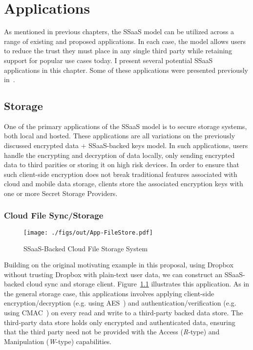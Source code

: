 \chapter{Applications}
\label{chap:apps}

As mentioned in previous chapters, the SSaaS model can be utilized
across a range of existing and proposed applications. In each case,
the model allows users to reduce the trust they must place in any
single third party while retaining support for popular use cases
today. I present several potential SSaaS applications in this
chapter. Some of these applications were presented previously
in~\cite{custos-trios}.

\section{Storage}

One of the primary applications of the SSaaS model is to secure
storage systems, both local and hosted. These applications are all
variations on the previously discussed encrypted data + SSaaS-backed
keys model. In such applications, users handle the encrypting and
decryption of data locally, only sending encrypted data to third
parities or storing it on high risk devices. In order to ensure that
such client-side encryption does not break traditional features
associated with cloud and mobile data storage, clients store the
associated encryption keys with one or more Secret Storage Providers.

\subsection{Cloud File Sync/Storage}

\begin{figure}[t]
  \centering
  \texttt{[image: ./figs/out/App-FileStore.pdf]}
  \caption{SSaaS-Backed Cloud File Storage System}
  \label{fig:apps-filestore}
\end{figure}

Building on the original motivating example in this proposal, using
Dropbox without trusting Dropbox with plain-text user data, we can
construct an SSaaS-backed cloud sync and storage
client. Figure~\ref{fig:apps-filestore} illustrates this
application. As in the general storage case, this applications
involves applying client-side encryption/decryption (e.g. using
AES~\cite{nist2001}) and authentication/verification (e.g. using
CMAC~\cite{dworkin2005}) on every read and write to a third-party
backed data store. The third-party data store holds only encrypted and
authenticated data, ensuring that the third party need not be provided
with the Access (\emph{R}-type) and Manipulation (\emph{W}-type)
capabilities.

